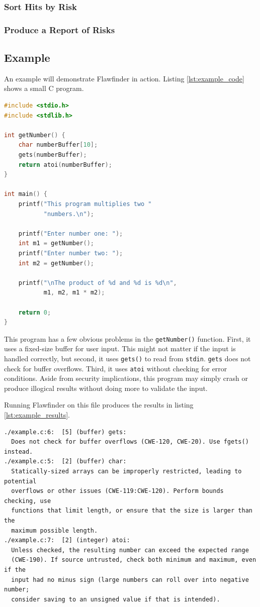 \documentclass[journal]{IEEEtran}
\def\tt#1{\mbox{\texttt{#1}}}
\begin{document}
\subsubsection{Sort Hits by Risk}

\subsubsection{Produce a Report of Risks}

\subsection{Example}

An example will demonstrate Flawfinder in action. Listing \ref{lst:example_code} shows a small C
program.

\begin{lstlisting}[language=c, caption=C Example Program, label=lst:example_code]
#include <stdio.h>
#include <stdlib.h>

int getNumber() {
    char numberBuffer[10];
    gets(numberBuffer);
    return atoi(numberBuffer);
}

int main() {
    printf("This program multiplies two "
           "numbers.\n");

    printf("Enter number one: ");
    int m1 = getNumber();
    printf("Enter number two: ");
    int m2 = getNumber();

    printf("\nThe product of %d and %d is %d\n",
           m1, m2, m1 * m2);

    return 0;
}
\end{lstlisting}

This program has a few obvious problems in the \tt{getNumber()} function. First, it uses a
fixed-size buffer for user input. This might not matter if the input is handled correctly, but
second, it uses \tt{gets()} to read from \tt{stdin}. \tt{gets} does not check for buffer overflows.
Third, it uses \tt{atoi} without checking for error conditions. Aside from security implications,
this program may simply crash or produce illogical results without doing more to validate the input.

Running Flawfinder on this file produces the results in listing \ref{lst:example_results}.

\begin{lstlisting}[caption=Example Flawfinder Results, label=lst:example_results]
./example.c:6:  [5] (buffer) gets:
  Does not check for buffer overflows (CWE-120, CWE-20). Use fgets() instead.
./example.c:5:  [2] (buffer) char:
  Statically-sized arrays can be improperly restricted, leading to potential
  overflows or other issues (CWE-119:CWE-120). Perform bounds checking, use
  functions that limit length, or ensure that the size is larger than the
  maximum possible length.
./example.c:7:  [2] (integer) atoi:
  Unless checked, the resulting number can exceed the expected range
  (CWE-190). If source untrusted, check both minimum and maximum, even if the
  input had no minus sign (large numbers can roll over into negative number;
  consider saving to an unsigned value if that is intended).
\end{lstlisting}
\end{document}
